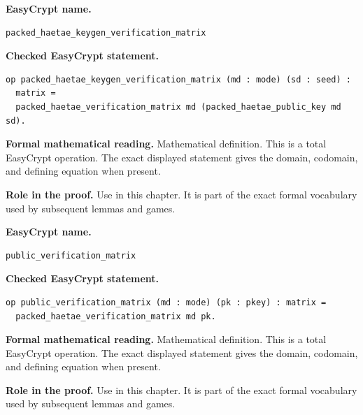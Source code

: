 \begin{formaldefinition}
\noindent\textbf{EasyCrypt name.}
\begin{lstlisting}[language=EasyCrypt,basicstyle=\ttfamily\scriptsize]
packed_haetae_keygen_verification_matrix
\end{lstlisting}
\noindent\textbf{Checked EasyCrypt statement.}
\begin{lstlisting}[language=EasyCrypt,basicstyle=\ttfamily\scriptsize]
op packed_haetae_keygen_verification_matrix (md : mode) (sd : seed) :
  matrix =
  packed_haetae_verification_matrix md (packed_haetae_public_key md sd).
\end{lstlisting}
\noindent\textbf{Formal mathematical reading.}
Mathematical definition. This is a total EasyCrypt operation.  The exact displayed statement gives the domain, codomain, and defining equation when present.

\noindent\textbf{Role in the proof.}
Use in this chapter. It is part of the exact formal vocabulary used by subsequent lemmas and games.

\end{formaldefinition}

\begin{formaldefinition}
\noindent\textbf{EasyCrypt name.}
\begin{lstlisting}[language=EasyCrypt,basicstyle=\ttfamily\scriptsize]
public_verification_matrix
\end{lstlisting}
\noindent\textbf{Checked EasyCrypt statement.}
\begin{lstlisting}[language=EasyCrypt,basicstyle=\ttfamily\scriptsize]
op public_verification_matrix (md : mode) (pk : pkey) : matrix =
  packed_haetae_verification_matrix md pk.
\end{lstlisting}
\noindent\textbf{Formal mathematical reading.}
Mathematical definition. This is a total EasyCrypt operation.  The exact displayed statement gives the domain, codomain, and defining equation when present.

\noindent\textbf{Role in the proof.}
Use in this chapter. It is part of the exact formal vocabulary used by subsequent lemmas and games.

\end{formaldefinition}

